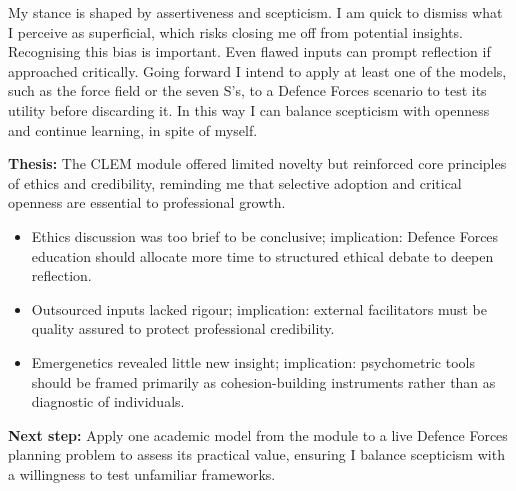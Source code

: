 My stance is shaped by assertiveness and scepticism. I am quick to dismiss what I perceive as superficial, which risks closing me off from potential insights. Recognising this bias is important. Even flawed inputs can prompt reflection if approached critically. Going forward I intend to apply at least one of the models, such as the force field or the seven S’s, to a Defence Forces scenario to test its utility before discarding it. In this way I can balance scepticism with openness and continue learning, in spite of myself.  

\textbf{Thesis:} The CLEM module offered limited novelty but reinforced core principles of ethics and credibility, reminding me that selective adoption and critical openness are essential to professional growth.  

\begin{itemize}
	\item Ethics discussion was too brief to be conclusive; implication: Defence Forces education should allocate more time to structured ethical debate to deepen reflection.  
	\item Outsourced inputs lacked rigour; implication: external facilitators must be quality assured to protect professional credibility.  
	\item Emergenetics revealed little new insight; implication: psychometric tools should be framed primarily as cohesion-building instruments rather than as diagnostic of individuals.  
\end{itemize}

\textbf{Next step:} Apply one academic model from the module to a live Defence Forces planning problem to assess its practical value, ensuring I balance scepticism with a willingness to test unfamiliar frameworks.  
